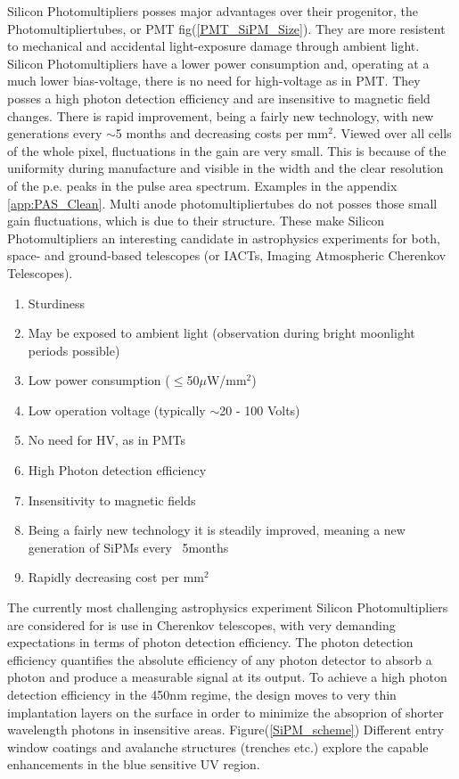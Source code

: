 \documentclass[12pt,article,type=msc,colorback,accentcolor=tud9c]{tudthesis}
\begin{document}
Silicon Photomultipliers posses major advantages over their progenitor, the Photomultipliertubes, or PMT fig(\ref{PMT_SiPM_Size}). They are more resistent to mechanical and accidental light-exposure damage through ambient light. Silicon Photomultipliers have a lower power consumption and, operating at a much lower bias-voltage, there is no need for high-voltage as in PMT. They posses a high photon detection efficiency and are insensitive to magnetic field changes. There is rapid improvement, being a fairly new technology, with new generations every $\sim$5 months and decreasing costs per mm$^2$. Viewed over all cells of the whole pixel, fluctuations in the gain are very small. This is because of the uniformity during manufacture and visible in the width and the clear resolution of the p.e. peaks in the pulse area spectrum. Examples in the appendix {\ref{app:PAS_Clean}}. Multi anode photomultipliertubes do not posses those small gain fluctuations, which is due to their structure. These make Silicon Photomultipliers an interesting candidate in astrophysics experiments for both, space- and ground-based telescopes (or IACTs, Imaging Atmospheric Cherenkov Telescopes). 
\begin{enumerate}
\item Sturdiness
\item May be exposed to ambient light (observation during bright moonlight periods possible)
\item Low power consumption ($\leq$50$\mu$W/mm$^2$)
\item Low operation voltage (typically $\sim$20 - 100 Volts)
\item No need for HV, as in PMTs
\item High Photon detection efficiency
\item Insensitivity to magnetic fields
\item Being a fairly new technology it is steadily improved, meaning a new generation of SiPMs every ~5months
\item Rapidly decreasing cost per mm$^2$
\end{enumerate}

The currently most challenging astrophysics experiment Silicon Photomultipliers are considered for is use in Cherenkov telescopes, with very demanding expectations in terms of photon detection efficiency. The photon detection efficiency quantifies the absolute efficiency of any photon detector to absorb a photon and produce a measurable signal at its output. To achieve a high photon detection efficiency in the 450nm regime, the design moves to very thin implantation layers on the surface in order to minimize the absoprion of shorter wavelength photons in insensitive areas. Figure(\ref{SiPM_scheme}) Different entry window coatings and avalanche structures (trenches etc.) explore the capable enhancements in the blue sensitive UV region.
\end{document}
